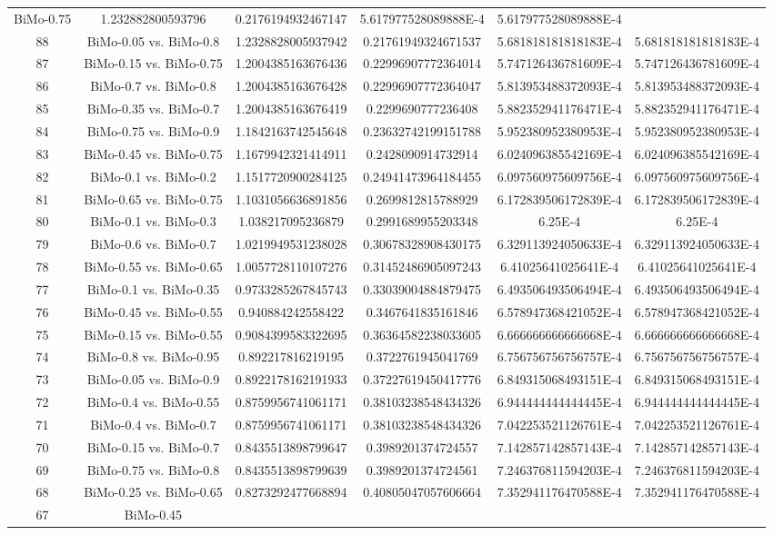 \documentclass[a4paper,10pt]{article}
\begin{document}
\begin{landscape}
\begin{table}[!htp]
\begin{tabular}{cccccc}
BiMo-0.75&1.232882800593796&0.2176194932467147&5.617977528089888E-4&5.617977528089888E-4\\88&BiMo-0.05 vs. BiMo-0.8&1.2328828005937942&0.21761949324671537&5.681818181818183E-4&5.681818181818183E-4\\87&BiMo-0.15 vs. BiMo-0.75&1.2004385163676436&0.22996907772364014&5.747126436781609E-4&5.747126436781609E-4\\86&BiMo-0.7 vs. BiMo-0.8&1.2004385163676428&0.22996907772364047&5.813953488372093E-4&5.813953488372093E-4\\85&BiMo-0.35 vs. BiMo-0.7&1.2004385163676419&0.2299690777236408&5.882352941176471E-4&5.882352941176471E-4\\84&BiMo-0.75 vs. BiMo-0.9&1.1842163742545648&0.23632742199151788&5.952380952380953E-4&5.952380952380953E-4\\83&BiMo-0.45 vs. BiMo-0.75&1.1679942321414911&0.2428090914732914&6.024096385542169E-4&6.024096385542169E-4\\82&BiMo-0.1 vs. BiMo-0.2&1.1517720900284125&0.24941473964184455&6.097560975609756E-4&6.097560975609756E-4\\81&BiMo-0.65 vs. BiMo-0.75&1.1031056636891856&0.2699812815788929&6.172839506172839E-4&6.172839506172839E-4\\80&BiMo-0.1 vs. BiMo-0.3&1.038217095236879&0.2991689955203348&6.25E-4&6.25E-4\\79&BiMo-0.6 vs. BiMo-0.7&1.0219949531238028&0.30678328908430175&6.329113924050633E-4&6.329113924050633E-4\\78&BiMo-0.55 vs. BiMo-0.65&1.0057728110107276&0.31452486905097243&6.41025641025641E-4&6.41025641025641E-4\\77&BiMo-0.1 vs. BiMo-0.35&0.9733285267845743&0.33039004884879475&6.493506493506494E-4&6.493506493506494E-4\\76&BiMo-0.45 vs. BiMo-0.55&0.940884242558422&0.3467641835161846&6.578947368421052E-4&6.578947368421052E-4\\75&BiMo-0.15 vs. BiMo-0.55&0.9084399583322695&0.36364582238033605&6.666666666666668E-4&6.666666666666668E-4\\74&BiMo-0.8 vs. BiMo-0.95&0.892217816219195&0.3722761945041769&6.756756756756757E-4&6.756756756756757E-4\\73&BiMo-0.05 vs. BiMo-0.9&0.8922178162191933&0.37227619450417776&6.849315068493151E-4&6.849315068493151E-4\\72&BiMo-0.4 vs. BiMo-0.55&0.8759956741061171&0.38103238548434326&6.944444444444445E-4&6.944444444444445E-4\\71&BiMo-0.4 vs. BiMo-0.7&0.8759956741061171&0.38103238548434326&7.042253521126761E-4&7.042253521126761E-4\\70&BiMo-0.15 vs. BiMo-0.7&0.8435513898799647&0.3989201374724557&7.142857142857143E-4&7.142857142857143E-4\\69&BiMo-0.75 vs. BiMo-0.8&0.8435513898799639&0.3989201374724561&7.246376811594203E-4&7.246376811594203E-4\\68&BiMo-0.25 vs. BiMo-0.65&0.8273292477668894&0.40805047057606664&7.352941176470588E-4&7.352941176470588E-4\\67&BiMo-0.45 
\end{tabular}
\end{table}
\end{landscape}
\end{document}
